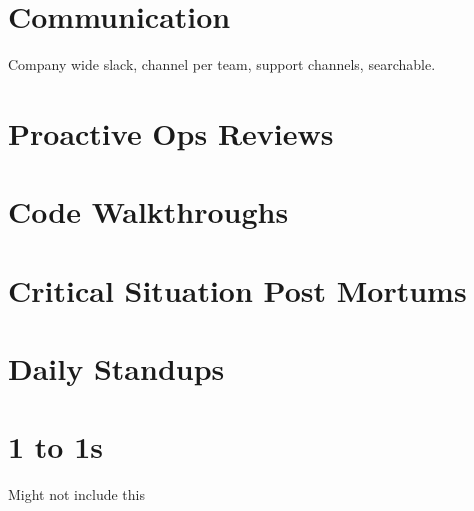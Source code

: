 \section{Communication}
Company wide slack, channel per team, support channels, searchable.

\section{Proactive Ops Reviews}

\section{Code Walkthroughs}

\section{Critical Situation Post Mortums}

\section{Daily Standups}

\section{1 to 1s}
Might not include this

